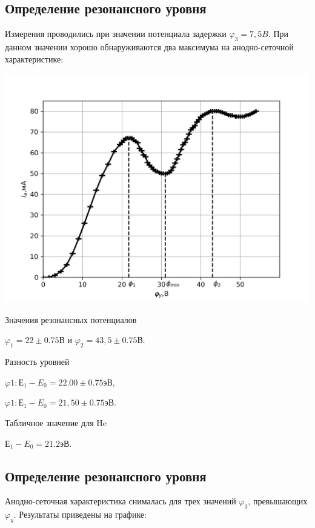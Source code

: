 \subsection{Определение резонансного уровня}
Измерения проводились при значении потенциала задержки $\varphi_{3}=7,5 B$. При данном значении хорошо обнаруживаются два максимума на анодно-сеточной характеристике: 
\begin{minipage}{\linewidth}
        \includegraphics[width=\linewidth]{11.png} 
\end{minipage}

Значения резонансных потенциалов 

$\varphi_{1}=22\pm{0.75} \text{В}$ и $\varphi_{2}=43,5\pm{0.75} \text{В}$. 

Разность уровней 

$\varphi1: \text{Е}_{1}-E_{0}=22.00\pm{0.75} \text{эВ}$, 

$\varphi1: \text{Е}_{1}-E_{0}=21,50\pm{0.75} \text{эВ}$.

Табличное значение для He

$\text{Е}_{1}-E_{0}=21.2 \text{эВ}$.

\subsection{Определение резонансного уровня}
Анодно-сеточная характеристика снималась для трех значений $\varphi_{3}$, превышающих $\varphi_{y}$. Результаты приведены на графике:

